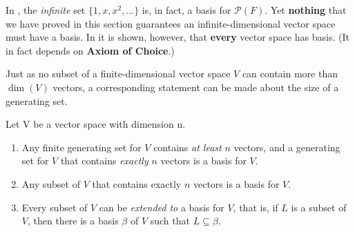 In , the \emph{infinite} \LID{} set \(\{1, x, x^2, ... \}\) is, in fact, a basis for \(\mathcal{P}(F)\).
Yet \textbf{nothing} that we have proved in this section guarantees an infinite-dimensional vector space must have a basis.
In  it is shown, however, that \textbf{every} vector space has basis. (It in fact depends on \textbf{Axiom of Choice}.)

Just as no \LID{} subset of a finite-dimensional vector space \(V\) can contain more than \(\dim(V)\) vectors, a corresponding statement can be
made about the size of a generating set.

\begin{corollary} \label{corollary 1.10.3}
Let V be a vector space with dimension n.
\begin{enumerate}
\item Any finite generating set for \(V\) contains \emph{at least} \(n\) vectors, and a generating set for \(V\) that contains \emph{exactly} \(n\) vectors is a basis for \(V\).
\item Any \LID{} subset of \(V\) that contains exactly \(n\) vectors is a basis for \(V\).
\item Every \LID{} subset of \(V\) can be \textit{extended to} a basis for \(V\),
    that is, if \(L\) is a \LID{} subset of \(V\), then there is a basis \(\beta\) of \(V\) such that \(L \subseteq \beta\).
\end{enumerate}
\end{corollary}

